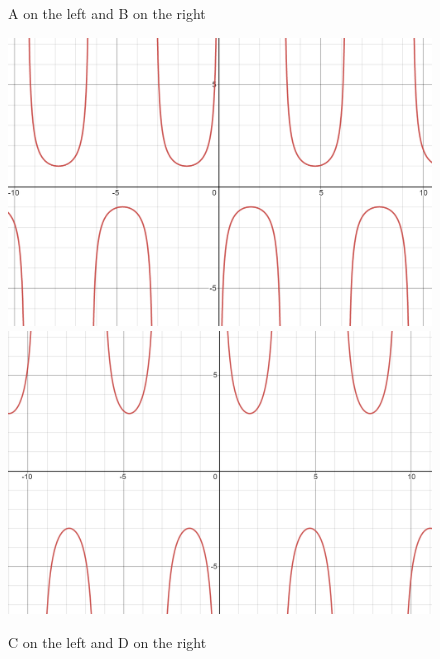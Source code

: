 \documentclass{ximera}
\begin{document}
\begin{exercise}
\begin{enumerate}
\begin{figure}[!h]
\begin{image}
\end{image}
\caption{A on the left and B on the right}
\end{figure}

\begin{figure}[!h]
\begin{image}
\includegraphics[width=.4\linewidth]{ex8-c.png}
\hspace{20mm}
\includegraphics[width=.4\linewidth]{ex8-d.png}
\end{image}
\caption{C on the left and D on the right}
\end{figure}

\begin{multipleChoice}
\end{multipleChoice}

\end{enumerate}
\end{exercise}
\end{document}
